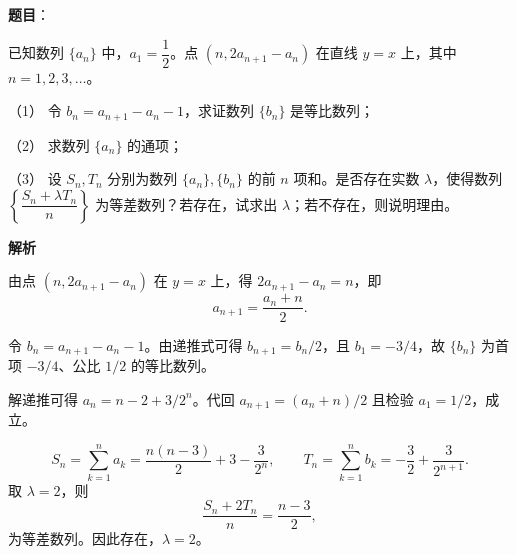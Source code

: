 \begin{answer}

\textbf{题目}：

已知数列 $\{a_n\}$ 中，$a_1=\dfrac12$。点 $(n,2a_{n+1}-a_n)$ 在直线 $y=x$ 上，其中 $n=1,2,3,\ldots$。

（1） 令 $b_n=a_{n+1}-a_n-1$，求证数列 $\{b_n\}$ 是等比数列；

（2） 求数列 $\{a_n\}$ 的通项；

（3） 设 $S_n,T_n$ 分别为数列 $\{a_n\},\{b_n\}$ 的前 $n$ 项和。是否存在实数 $\lambda$，使得数列 $\left\{\dfrac{S_n+\lambda T_n}{n}\right\}$ 为等差数列？若存在，试求出 $\lambda$；若不存在，则说明理由。

\textbf{解析}

由点 $(n,2a_{n+1}-a_n)$ 在 $y=x$ 上，得 $2a_{n+1}-a_n=n$，即
\nopagebreak[4]
\[
a_{n+1}=\frac{a_n+n}{2}.
\]


令 $b_n=a_{n+1}-a_n-1$。由递推式可得 $b_{n+1}=b_n/2$，且 $b_1=-3/4$，故 $\{b_n\}$ 为首项 $-3/4$、公比 $1/2$ 的等比数列。


解递推可得 $a_n=n-2+3/2^n$。代回 $a_{n+1}=(a_n+n)/2$ 且检验 $a_1=1/2$，成立。


\nopagebreak[4]
\[
S_n=\sum_{k=1}^n a_k=\frac{n(n-3)}2+3-\frac3{2^n},\qquad
T_n=\sum_{k=1}^n b_k=-\frac32+\frac3{2^{n+1}}.
\]
取 $\lambda=2$，则
\nopagebreak[4]
\[
\frac{S_n+2T_n}{n}=\frac{n-3}{2},
\]
为等差数列。因此存在，$\lambda=2$。




\end{answer}